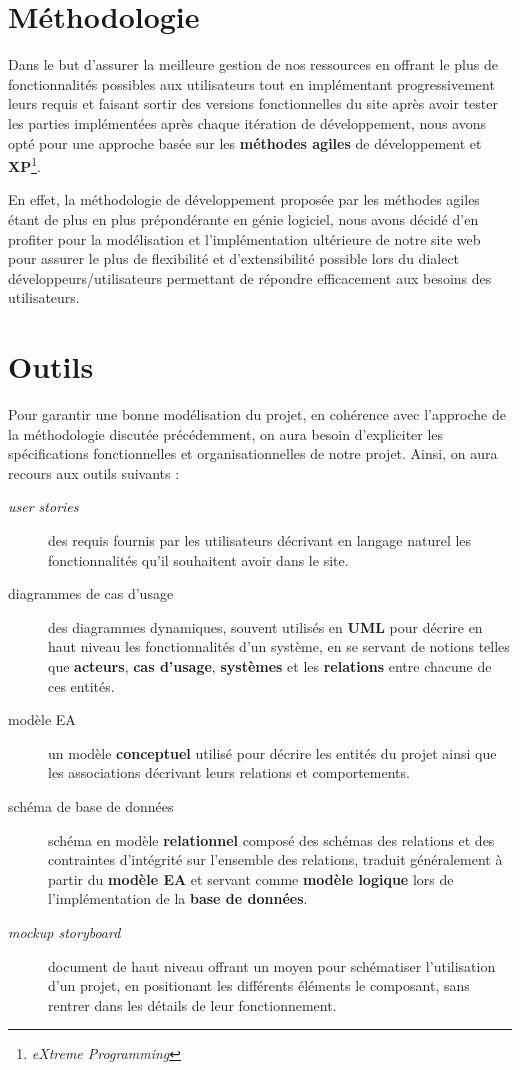 \documentclass[a4paper,12pt]{book}
\theoremstyle{break}
\theoremstyle{break}
\theoremstyle{break}
\theoremstyle{break}
\theoremstyle{definition}
\theoremstyle{remark}
\begin{document}
\section{Méthodologie}
Dans le but d'assurer la meilleure gestion de nos ressources en offrant le plus de fonctionnalités possibles aux utilisateurs tout en implémentant progressivement leurs requis et faisant sortir des versions fonctionnelles du site après avoir tester les parties implémentées après chaque itération de développement, nous avons opté pour une approche basée sur les \textbf{méthodes agiles} de développement et \textbf{XP}\footnote{\textit{eXtreme Programming}}.

En effet, la méthodologie de développement proposée par les méthodes agiles étant de plus en plus prépondérante en génie logiciel, nous avons décidé d'en profiter pour la modélisation et l'implémentation ultérieure de notre site web pour assurer le plus de flexibilité et d'extensibilité possible lors du dialect développeurs/utilisateurs permettant de répondre efficacement aux besoins des utilisateurs.
\section{Outils}
Pour garantir une bonne modélisation du projet, en cohérence avec l'approche de la méthodologie discutée précédemment, on aura besoin d'expliciter les spécifications fonctionnelles et organisationnelles de notre projet. Ainsi, on aura recours aux outils suivants :
\begin{description}
  \item[\textit{user stories}]{des requis fournis par les utilisateurs décrivant en langage naturel les fonctionnalités qu'il souhaitent avoir dans le site.}
  \item[diagrammes de cas d'usage]{des diagrammes dynamiques, souvent utilisés en \textbf{UML} pour décrire en haut niveau les fonctionnalités d'un système, en se servant de notions telles que \textbf{acteurs}, \textbf{cas d'usage}, \textbf{systèmes} et les \textbf{relations} entre chacune de ces entités.}
  \item[modèle EA]{un modèle \textbf{conceptuel} utilisé pour décrire les entités du projet ainsi que les associations décrivant leurs relations et comportements.}
  \item[schéma de base de données]{schéma en modèle \textbf{relationnel} composé des schémas des relations et des contraintes d'intégrité sur l'ensemble des relations, traduit généralement à partir du \textbf{modèle EA} et servant comme \textbf{modèle logique} lors de l'implémentation de la \textbf{base de données}.}
  \item[\textit{mockup storyboard}]{document de haut niveau offrant un moyen pour schématiser l'utilisation d'un projet, en positionant les différents éléments le composant, sans rentrer dans les détails de leur fonctionnement.}
\end{description}
\end{document}
